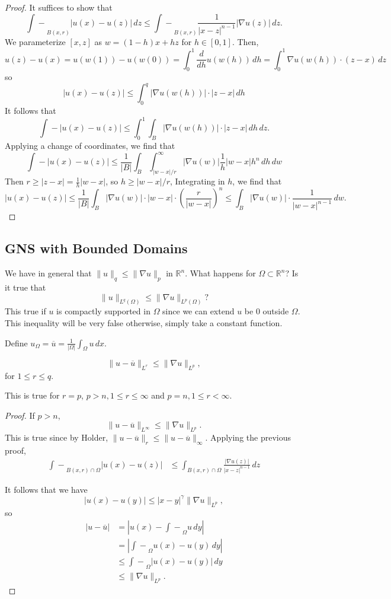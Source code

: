 \documentclass[12pt]{scrartcl}
\newcommand{\R}{\mathbb{R}}
\let \ol \overline
\newcommand{\aint}{\mathrel{\int\!\!\!\!\!\!-}}
\let \grad \nabla
\begin{document}
\begin{proof}
It suffices to show that
$$\mathrel{\int\!\!\!\!\!\!-}_{B(x, r)}|u(x) - u(z)|\,dz \le \mathrel{\int\!\!\!\!\!\!-}_{B(x, r)}\frac{1}{|x-z|^{n-1}}|\grad u(z)|\, dz.$$
We parameterize $[x, z]$ as $w = (1-h) x + hz$ for $h \in [0, 1]$.  Then,
$$u(z) - u(x) = u(w(1)) - u(w(0)) = \int_{0}^1 \frac{d}{dh} u(w(h))\,dh = \int_{0}^1 \grad u(w(h)) \cdot (z-x) \,dz$$
so 
$$|u(x) - u(z)| \le \int_{0}^q |\grad u(w(h))|\cdot |z-x|\, dh$$ 
It follows that 
$$\aint |u(x) - u(z)| \le \int_{0}^1 \int_B |\grad u(w(h))| \cdot |z-x|\, dh\, dz.$$
Applying a change of coordinates, we find that 
$$\aint |u(x) - u(z)| \le \frac{1}{|B|} \int_B \int_{|w-x|/r}^\infty |\grad u(w)| \frac{1}{h}|w-x| h^n  \, dh \, dw $$
Then $r \ge |z-x| = \frac{1}{h}|w-x|$, so $h \ge |w-x|/r$,  Integrating in $h$, we find that 
$$|u(x) - u(z)| \le \frac{1}{|B|}\int_B |\grad u(w)| \cdot |w-x| \cdot \left (\frac{r}{|w-x|}\right )^n \le \int_B |\grad u(w)| \cdot \frac{1}{|w-x|^{n-1}}\,dw.$$
\end{proof}

\subsection{GNS with Bounded Domains}
We have in general that $\|u\|_q \le \|\grad u\|_{p}$ in $\R^n$.  What happens for $\Omega \subset \R^n$?
Is it true that $$\|u\|_{L^q(\Omega)} \le \|\grad u\|_{L^p(\Omega)}?$$
This true if $u$ is compactly supported in $\Omega$ since we can extend $u$ be $0$ outside $\Omega$.  This inequality will be very false otherwise, simply take a constant function.

Define $u_\Omega = \overline{u} = \frac{1}{|\Omega|} \int_\Omega u\, dx$.  
\begin{thm}
$$\|u-\ol u\|_{L^r} \le \|\grad u\|_{L^p},$$
for $1 \le r \le q.$

This is true for $r=p$, $p > n, 1 \le r \le \infty$ and $p = n, 1 \le r < \infty$.
\end{thm}
\begin{proof}
If $p > n$, 
$$\|u-\ol{u} \|_{L^\infty} \le \|\grad u\|_{L^p}.$$
This is true since by Holder, $\|u - \ol u \|_r \le \|u - \ol u\|_\infty$.
Applying the previous proof,
\begin{align*}
\aint_{B(x, r)\cap \Omega}|u(x) - u(z)| &\le \int_{B(x, r)\cap \Omega} \frac{|\grad u(z)|}{|x-z|^{n-1}}\,dz
\end{align*}

It follows that we have $$|u(x) - u(y)| \le |x-y|^{\gamma} \|\grad u\|_{L^p},$$
so 
\begin{align*}
|u - \ol u| &=\left  |u(x)  - \aint_\Omega u\, dy\right |\\
&= \left |\aint_\Omega u(x) - u(y) \, dy\right |\\
&\le \aint_\Omega |u(x) - u(y)| \, dy\\
&\le \|\grad u \|_{L^p}.
\end{align*}

\end{proof}
\end{document}
